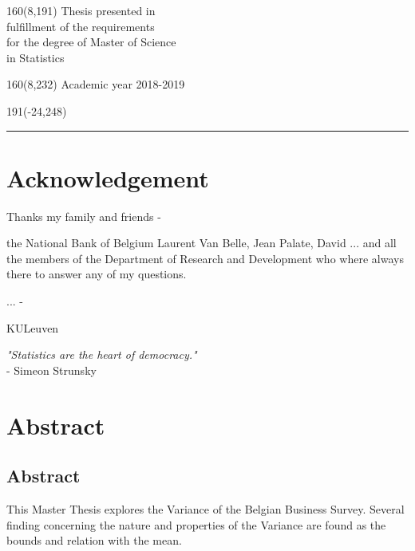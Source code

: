 \documentclass[12pt,a4paper,oneside]{book}
\begin{document}
%
\begin{textblock}{160}(8,191)
\textblockcolour{}
\vspace{-\parskip}
\flushright
Thesis presented in\\[4.5pt]
fulfillment of the requirements\\[4.5pt]
for the degree of Master of Science\\[4.5pt]
in Statistics\\
\end{textblock}
%
\begin{textblock}{160}(8,232)
\textblockcolour{}
\vspace{-\parskip}
\flushright
Academic year 2018-2019
\end{textblock}
%
\begin{textblock}{191}(-24,248)
{\color{blueline}\rule{550pt}{5.5pt}}
\end{textblock}
%
\vfill
\newpage

\rmfamily
\setcounter{page}{0}
\pagestyle{plain}



\chapter*{Acknowledgement}
Thanks my family and friends - 

the National Bank of Belgium Laurent Van Belle, Jean Palate, David ... and all the members of the Department of Research and Development who where always there to answer any of my questions.

... - 

KULeuven


\vfill
\textit{"Statistics are the heart of democracy." }\\
- Simeon Strunsky


\chapter*{Abstract}


\section*{Abstract}
This Master Thesis explores the Variance of the Belgian Business Survey. 
Several finding concerning the nature and properties of the Variance are found as the bounds and relation with the mean.
\end{document}
